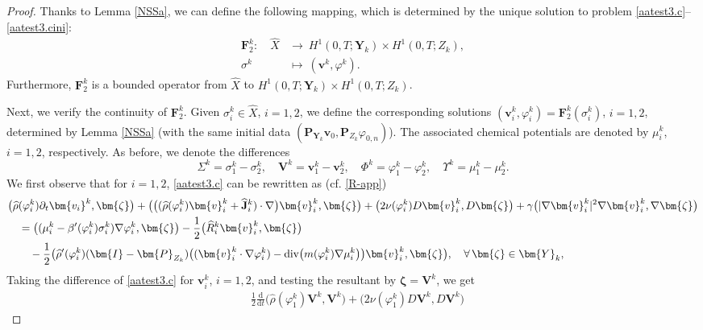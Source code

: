 \documentclass[11pt,reqno]{amsart}
\def\div{\mathrm{div}}
\def\J{\mathbf{J}}
\def\vv{\bm{v}}
\begin{document}
\begin{proof}
Thanks to Lemma \ref{NSSa}, we can define the following mapping, which is determined by the unique solution to problem \eqref{aatest3.c}--\eqref{aatest3.cini}:
%
\begin{align*}
\mathbf{F}^k_{2}:\quad  \widehat{X} &\to\  H^1(0,T;\bm{Y}_{k})\times H^1(0,T;Z_{k}),
\\
\sigma^{k} &\mapsto\ (\bm{v}^k,\varphi^k).
\end{align*}
%
Furthermore, $\mathbf{F}^k_2$ is a bounded operator from $\widehat{X}$ to $H^1(0,T;\bm{Y}_{k})\times H^1(0,T;Z_{k})$.

Next, we verify the continuity of $\mathbf{F}^k_2$. Given $\sigma^{k}_{i}\in \widehat{X}$, $i=1,2$, we define the corresponding solutions $(\bm{v}^{k}_{i},\varphi^{k}_{i})=\mathbf{F}^k_2(\sigma^{k}_{i})$, $i=1, 2$, determined by Lemma \ref{NSSa} (with the same initial data $(\bm{P}_{\bm{Y}_{k}} \bm{v}_{0}, \bm{P}_{Z_{k}}\varphi_{0,n})$).
The associated chemical potentials are denoted by $\mu_i^k$, $i=1,2$, respectively. As before, we denote the differences
 $$
 \Sigma^{k}=\sigma_{1}^{k}-\sigma_{2}^{k},\quad
 \bm{V}^{k}=\bm{v}^{k}_{1}-\bm{v}^{k}_{2},\quad
 \Phi^{k}= \varphi_{1}^{k}-\varphi_{2}^{k},\quad
 \Upsilon^{k}=  \mu_{1}^{k}-\mu_{2}^{k}.
 $$
%
We first observe that for $i=1,2$, \eqref{aatest3.c} can be rewritten as (cf. \eqref{R-app})
\begin{align}
	& \big(  \widehat{\rho}(\varphi_i^k) \partial_t \bm{v_i}^k,\bm{\zeta}\big)
	+\big( \big( (\widehat{\rho}(\varphi_i^k)\bm{v}_i^k + \widehat{\J}_i^k)\cdot \nabla \big)\bm{v}_i^k, \bm{ \zeta}\big)
    +\big(  2\nu(\varphi_i^{k}) D\bm{v}_i^k, D\bm{\zeta}\big)
    +\gamma \big(|\nabla\vv_i^k|^2\nabla\vv_i^k,\nabla \bm{\zeta}\big)
    \notag \\
&\quad =\big((\mu_i^{k}-\beta'(\varphi_i^k)\sigma_i^{k})\nabla \varphi_i^{k},\bm {\zeta}\big)- \frac12 \big(\widehat{R}_i^k\vv_i^k,\bm{\zeta}\big)
\notag\\
&\qquad - \frac12\big(\widehat{\rho}'(\varphi_i^k)(\bm{I}-\bm{P}_{Z_{k}}) \big((\bm{v}_i^k\cdot\nabla\varphi_i^k)-\div \big(m(\varphi_i^k)\nabla \mu_i^k\big)\big)\bm{v}_i^k,\bm{\zeta}\big),
\quad \forall\, \bm{\zeta} \in \bm{Y}_{k},
	\label{aatest3.c2}
\end{align}
%
Taking the difference of \eqref{aatest3.c} for $\bm{v}^{k}_{i}$, $i=1,2$, and testing the resultant by $\bm{\zeta}=\bm{V}^k$, we get
%
\begin{align}
& \frac12\frac{\mathrm{d}}{\mathrm{d}t} \big(\widehat{\rho}(\varphi_1^k)\bm{V}^k,\bm{V}^k\big)
+\big(  2\nu(\varphi^{k}_1) D\bm{V}^k, D\bm{V}^k\big)

\end{align}
\end{proof}
\end{document}

